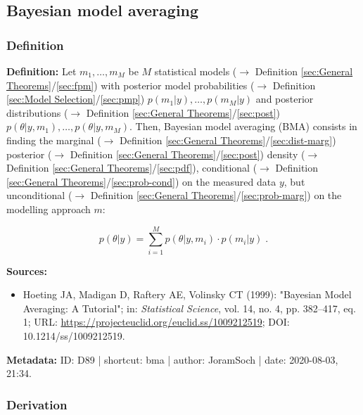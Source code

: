 \documentclass[a4paper,12pt,twoside]{book}
\begin{document}
\subsection{Bayesian model averaging}

\subsubsection[\textit{Definition}]{Definition} \label{sec:bma}
\setcounter{equation}{0}

\textbf{Definition:} Let $m_1, \ldots, m_M$ be $M$ statistical models ($\rightarrow$ Definition \ref{sec:General Theorems}/\ref{sec:fpm}) with posterior model probabilities ($\rightarrow$ Definition \ref{sec:Model Selection}/\ref{sec:pmp}) $p(m_1 \vert y), \ldots, p(m_M \vert y)$ and posterior distributions ($\rightarrow$ Definition \ref{sec:General Theorems}/\ref{sec:post}) $p(\theta \vert y, m_1), \ldots, p(\theta \vert y, m_M)$. Then, Bayesian model averaging (BMA) consists in finding the marginal ($\rightarrow$ Definition \ref{sec:General Theorems}/\ref{sec:dist-marg}) posterior ($\rightarrow$ Definition \ref{sec:General Theorems}/\ref{sec:post}) density ($\rightarrow$ Definition \ref{sec:General Theorems}/\ref{sec:pdf}), conditional ($\rightarrow$ Definition \ref{sec:General Theorems}/\ref{sec:prob-cond}) on the measured data $y$, but unconditional ($\rightarrow$ Definition \ref{sec:General Theorems}/\ref{sec:prob-marg}) on the modelling approach $m$:

\begin{equation} \label{eq:bma-BMA}
p(\theta|y) = \sum_{i=1}^{M} p(\theta|y,m_i) \cdot p(m_i|y) \; .
\end{equation}


\vspace{1em}
\textbf{Sources:}
\begin{itemize}
\item Hoeting JA, Madigan D, Raftery AE, Volinsky CT (1999): "Bayesian Model Averaging: A Tutorial"; in: \textit{Statistical Science}, vol. 14, no. 4, pp. 382–417, eq. 1; URL: \url{https://projecteuclid.org/euclid.ss/1009212519}; DOI: 10.1214/ss/1009212519.
\end{itemize}


\vspace{1em}
\textbf{Metadata:} ID: D89 | shortcut: bma | author: JoramSoch | date: 2020-08-03, 21:34.
\vspace{1em}



\subsubsection[\textbf{Derivation}]{Derivation} \label{sec:bma-der}
\setcounter{equation}{0}
\end{document}
